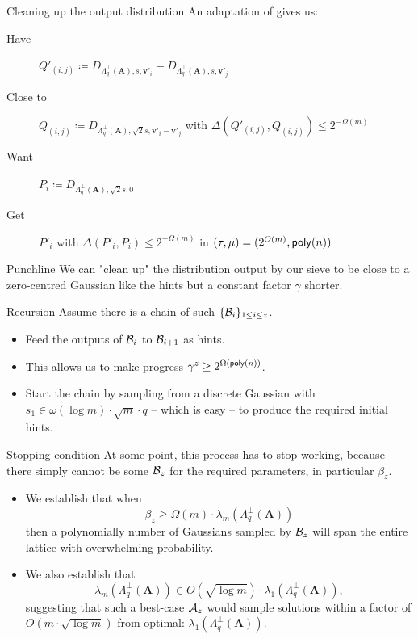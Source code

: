 \documentclass[xcolor=table,10pt,aspectratio=169]{beamer}
\renewcommand{\vec}[1]{\ensuremath{\mathbf{#1}}\xspace}
\providecommand{\mat}[1]{\ensuremath{\vec{#1}}\xspace}
\begin{document}
\begin{frame}[label={sec:org3c741bd}]{Cleaning up the output distribution}
An adaptation of \autocite{AC:DFPS22} gives us:

\begin{description}
\item[{Have}] \(Q'_{(i,j)} \coloneqq D_{\Lambda_q^\bot(\mat{A}),s,\vec{v}'_i} - D_{\Lambda_q^\bot(\mat{A}),s,\vec{v}'_j}\)
\item[{Close to}] \(Q_{(i,j)} \coloneqq D_{\Lambda_q^\bot(\mat{A}),\sqrt{2}s,\vec{v}'_i-\vec{v}'_j}\) with \(\Delta(Q'_{(i,j)}, Q_{(i,j)}) \leq 2^{-\Omega(m)}\)
\item[{Want}] \(P_{i} \coloneqq D_{\Lambda_q^\bot(\mat{A}),\sqrt{2}s,0}\)
\item[{Get}] \(P'_{i}\) with \(\Delta(P'_{i}, P_{i}) \leq 2^{-\Omega(m)}\) in \((\tau,\mu) = (2^{O(m)}, \poly[n])\)
\end{description}
\begin{alertblock}{Punchline}
We can "clean up" the distribution output by our sieve to be close to a zero-centred Gaussian like the hints but a constant factor \(\gamma\) shorter.
\end{alertblock}
\end{frame}
\begin{frame}[label={sec:orgb624547}]{Recursion}
Assume there is a chain of such \(\{\mathcal{B}_{i}\}_{1 \leq i \leq z}\).

\begin{itemize}
\item Feed the outputs of \(\mathcal{B}_{i}\) to \(\mathcal{B}_{i+1}\) as hints.
\item This allows us to make progress \(\gamma^{z} \ge 2^{\Omega(\poly[n])}\).
\item Start the chain by sampling from a discrete Gaussian with \(s_{1} \in \omega(\log m) \cdot \sqrt{m} \cdot q\) -- which is easy -- to produce the required initial hints.
\end{itemize}
\end{frame}
\begin{frame}[label={sec:org4e1827b}]{Stopping condition}
At some point, this process has to stop working, because there simply cannot be some \(\mathcal{B}_{z}\) for the required parameters, in particular \(\beta_{z}\).

\begin{itemize}
\item We establish that when
\[
  \beta_{z} \ge \Omega(m) \cdot \lambda_{m}(\Lambda_q^{\bot}(\mat{A}))
  \]
then a polynomially number of Gaussians sampled by \(\mathcal{B}_{z}\) will span the entire lattice with overwhelming probability.
\item We also establish that
\[
  \lambda_{m}(\Lambda_q^{\bot}(\mat{A})) \in O(\sqrt{\log m}) \cdot \lambda_{1}(\Lambda_q^{\bot}(\mat{A})),
  \]
suggesting that such a best-case \(\mathcal{A}_{z}\) would sample solutions within a factor of \(O(m \cdot \sqrt{\log m})\) from optimal: \(\lambda_{1}(\Lambda_q^{\bot}(\mat{A}))\).
\end{itemize}
\end{frame}
\end{document}
